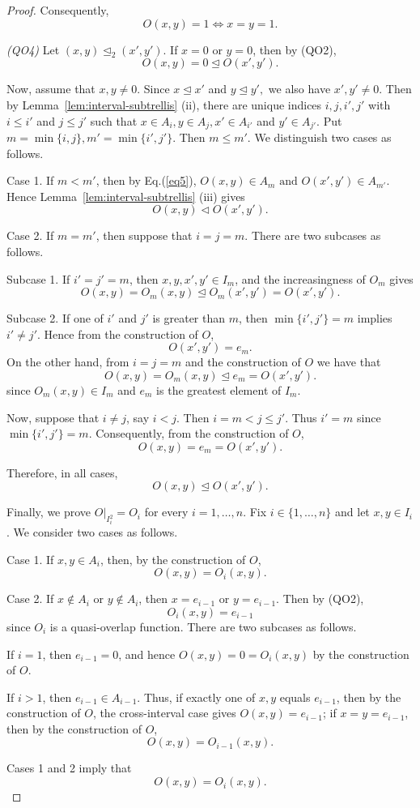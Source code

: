 \documentclass[preprint,12pt]{elsarticle}
\begin{document}
\begin{proof}
Consequently,
$$
 O(x,y)=1
 \Longleftrightarrow
 x=y=1.
$$

\emph{(QO4)}
Let
$
(x,y)\trianglelefteq_2(x',y').
$
If $x=0$ or $y=0$, then by (QO2),
$$
 O(x,y)=0\trianglelefteq O(x',y').
$$

Now, assume that $x,y\neq0$. Since
$
x\trianglelefteq x'
$
and
$
y\trianglelefteq y',
$
we also have $x',y'\neq0$. Then by Lemma~\ref{lem:interval-subtrellis} (ii), there are unique
indices $i,j,i',j'$ with $i\leq i'$ and $j\leq j'$ such that
$x\in A_i, y\in A_j, x'\in A_{i'}$ and $y'\in A_{j'}$. Put
$
 m=\min\{i,j\},
 m'=\min\{i',j'\}.
$
Then $m\leq m'$. We distinguish two cases as follows.

Case 1. If $m<m'$, then by Eq.(\ref{eq5}),
$
 O(x,y)\in A_m
 \mbox{ and }
 O(x',y')\in A_{m'}.
$
Hence Lemma~\ref{lem:interval-subtrellis} (iii) gives
$$
 O(x,y)\triangleleft O(x',y').
$$

Case 2. If $m=m'$, then suppose that $i=j=m$.
There are two subcases as follows.

Subcase 1. If $i'=j'=m$, then $x,y,x',y'\in I_m$, and the
increasingness of $O_m$ gives
$$
 O(x,y)
 =
 O_m(x,y)
 \trianglelefteq
 O_m(x',y')
 =
 O(x',y').
$$

Subcase 2. If one of $i'$ and $j'$ is greater than $m$, then
$\min\{i',j'\}=m$ implies $i'\neq j'$. Hence from the construction of $O$,
$$
 O(x',y')=e_m.
$$
On the other hand, from $i=j=m$ and the construction of $O$ we have that
$$
 O(x,y)
 =
 O_m(x,y)
 \trianglelefteq
 e_m
 =
 O(x',y').
$$
since $O_m(x,y)\in I_m$ and $e_m$ is the greatest element of
$I_m$.

Now, suppose that $i\neq j$, say $i<j$. Then $i=m<j\leq j'$.
Thus $i'=m$ since $\min\{i',j'\}=m$.
Consequently,  from the construction of $O$,
$$
 O(x,y)=e_m=O(x',y').
$$

Therefore, in all cases,
$$
 O(x,y)\trianglelefteq O(x',y').
$$


Finally, we prove $O|_{I_i^2}=O_i$ for every $i=1,\ldots,n$. Fix
$i\in\{1,\ldots,n\}$ and let $x,y\in I_i$. We consider two cases as follows.

Case 1. If $x,y\in A_i$, then, by the construction of $O$,
$$
O(x,y)=O_i(x,y).
$$

Case 2. If $x\notin A_i$ or $y\notin A_i$, then $x=e_{i-1}$ or $y=e_{i-1}$. Then by (QO2),
$$
O_i(x,y)=e_{i-1}
$$
since $O_i$ is a quasi-overlap function. There are two subcases as follows.

If $i=1$, then $e_{i-1}=0$, and hence
$O(x,y)=0=O_i(x,y)$ by the construction of $O$.

If $i>1$, then $e_{i-1}\in A_{i-1}$. Thus, if exactly one of
$x,y$ equals $e_{i-1}$, then by the construction of $O$, the cross-interval case gives
$O(x,y)=e_{i-1}$; if $x=y=e_{i-1}$, then by the construction of $O$,
$$
O(x,y)=O_{i-1}(x,y).
$$

Cases 1 and 2 imply that
$$
O(x,y)=O_i(x,y).
$$
\end{proof}
\end{document}
